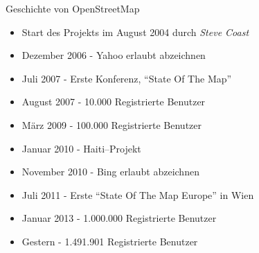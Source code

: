 \documentclass[handout]{beamer}
\begin{document}
  
{

\begin{frame}{Geschichte von OpenStreetMap}
  \vspace{0.6cm}
\begin{itemize}
  \item Start des Projekts im August 2004 durch \emph{Steve Coast}
  \item Dezember 2006 - Yahoo erlaubt abzeichnen
  \item Juli 2007 - Erste Konferenz, "`State Of The Map"'
  \item August 2007 - 10.000 Registrierte Benutzer
  \item März 2009 - 100.000 Registrierte Benutzer
  \item Januar 2010 - Haiti--Projekt
  \item November 2010 - Bing erlaubt abzeichnen
  \item Juli 2011 - Erste "`State Of The Map Europe"' in Wien
  \item Januar 2013 - 1.000.000 Registrierte Benutzer
  \item Gestern - 1.491.901 Registrierte Benutzer
\end{itemize}

\end{frame}
}
\end{document}
